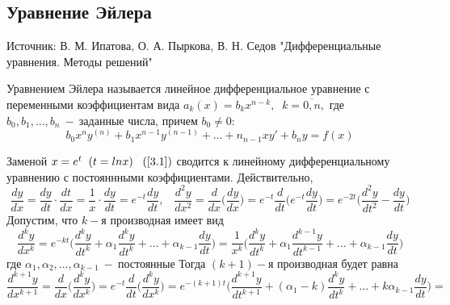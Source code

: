 \subsection{Уравнение Эйлера}
\begin{remark}
Источник: В. М. Ипатова, О. А. Пыркова, В. Н. Седов "Дифференциальные уравнения. Методы решений"
\end{remark}
\begin{definition}
Уравнением Эйлера называется линейное дифференциальное уравнение с переменными 
коэффициентам вида $a_k(x)=b_kx^{n-k}, \;\;k=\overline{0, n},$ где $b_0, b_1, \dots, b_n~-~$заданные числа, причем $b_0\neq 0:$
\begin{equation}
\tag{3.1}
\label{3.1}
    b_0x^ny^{(n)}+b_1x^{n-1}y^{(n-1)}+\dots+n_{n-1}xy'+b_ny=f(x)
\end{equation}
\end{definition}
Заменой $x=e^t\;\;(t=ln x)\;\;\;(\ref{3.1})$ сводится к линейному дифференциальному уравнению с постояннными коэффициентами. Действительно, $$\frac{dy}{dx}=\frac{dy}{dt}\cdot\frac{dt}{dx}=\frac{1}{x}\cdot \frac{dy}{dt}=e^{-t}\frac{dy}{dt}, \;\;\;\frac{d^2y}{dx^2}=\frac{d}{dx}\Big(\frac{dy}{dx}\Big)=e^{-t}\frac{d}{dt}\Big(e^{-t}\frac{dy}{dt}\Big)=e^{-2t}\Big(\frac{d^2y}{dt^2}-\frac{dy}{dt}\Big)$$
Допустим, что $k-$я производная имеет вид $$\frac{d^ky}{dx^k}=e^{-kt}\Big(\frac{d^ky}{dt^k}+\alpha_1\frac{d^ky}{dt^k}+\dots+\alpha_{k-1}\frac{dy}{dt}\Big)=\frac{1}{x^k}\Big(\frac{d^ky}{dt^k}+\alpha_1\frac{d^{k-1}y}{dt^{k-1}}+\dots+\alpha_{k-1}\frac{dy}{dt}\Big)$$ где $\alpha_1, \alpha_2, \dots, \alpha_{k-1}~-~\text{постоянные}$
Тогда $(k+1)-$я производная будет равна \begin{equation}
    \frac{d^{k+1}y}{dx^{k+1}}=\frac{d}{dx}\Big(\frac{d^ky}{dx^k}\Big)=e^{-t}\frac{d}{dt}\Big(\frac{d^ky}{dx^k}\Big)=e^{-(k+1)t}\Big(\frac{d^{k+1}y}{dt^{k+1}}+(\alpha_1-k)\frac{d^ky}{dt^k}+\dots+k\alpha_{k-1}\frac{dy}{dt}\Big) =
\end{equation}
    
